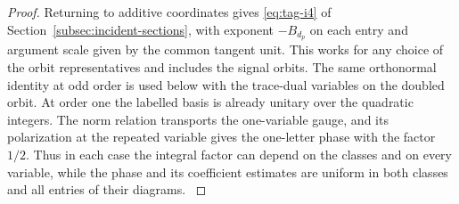\begin{proof}
Returning to additive coordinates gives \eqref{eq:tag-i4} of
Section~\ref{subsec:incident-sections}, with exponent
\(-B_{d_p}\) on each entry and argument scale given by the
common tangent unit. This works for any choice of the orbit
representatives and includes the signal orbits. The same
orthonormal identity at odd order is used below with the
trace-dual variables on the doubled orbit. At order one the
labelled basis is already unitary over the quadratic integers.
The norm relation transports the one-variable gauge, and its
polarization at the repeated variable gives the one-letter
phase with the factor \(1/2\). Thus in each case the integral
factor can depend on the classes and on every variable, while
the phase and its coefficient estimates are uniform in both
classes and all entries of their diagrams. \label{cor:unserved-kernel-charts-3}
\end{proof}
